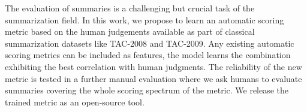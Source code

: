 The evaluation of summaries is a challenging but crucial task of the summarization field. In this work, we propose to learn an automatic scoring metric based on the human judgements available as part of classical summarization datasets like TAC-2008 and TAC-2009. Any existing automatic scoring metrics can be included as features, the model learns the combination exhibiting the best correlation with human judgments. The reliability of the new metric is tested in a further manual evaluation where we ask humans to evaluate summaries covering the whole scoring spectrum of the metric. We release the trained metric as an open-source tool.
